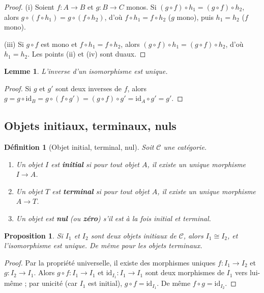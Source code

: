 \documentclass[a4paper,12pt]{book}
\newcommand{\id}{\mathrm{id}}
\newtheorem{proposition}[theoreme]{Proposition}
\newtheorem{lemme}[theoreme]{Lemme}
\newtheorem{definition}[theoreme]{Définition}
\begin{document}
\begin{proof}
(i) Soient $f : A \to B$ et $g : B \to C$ monos. Si $(g \circ f) \circ h_1 = (g \circ f) \circ h_2$, alors $g \circ (f \circ h_1) = g \circ (f \circ h_2)$, d'où $f \circ h_1 = f \circ h_2$ ($g$ mono), puis $h_1 = h_2$ ($f$ mono).

(iii) Si $g \circ f$ est mono et $f \circ h_1 = f \circ h_2$, alors $(g \circ f) \circ h_1 = (g \circ f) \circ h_2$, d'où $h_1 = h_2$. Les points (ii) et (iv) sont duaux.
\end{proof}

\begin{lemme}\label{lem:unicite-inverse}
L'inverse d'un isomorphisme est unique.
\end{lemme}

\begin{proof}
Si $g$ et $g'$ sont deux inverses de $f$, alors $g = g \circ \id_B = g \circ (f \circ g') = (g \circ f) \circ g' = \id_A \circ g' = g'$.
\end{proof}

\subsection{Objets initiaux, terminaux, nuls}

\begin{definition}[Objet initial, terminal, nul]\label{def:init-term-nul}
Soit $\mathcal{C}$ une catégorie.
\begin{enumerate}[label=(\roman*)]
  \item Un objet $I$ est \textbf{initial} si pour tout objet $A$, il existe un unique morphisme $I \to A$.
  \item Un objet $T$ est \textbf{terminal} si pour tout objet $A$, il existe un unique morphisme $A \to T$.
  \item Un objet est \textbf{nul} (ou \textbf{zéro}) s'il est à la fois initial et terminal.
\end{enumerate}
\end{definition}

\begin{proposition}\label{prop:init-term-unique}
Si $I_1$ et $I_2$ sont deux objets initiaux de $\mathcal{C}$, alors $I_1 \cong I_2$, et l'isomorphisme est unique. De même pour les objets terminaux.
\end{proposition}

\begin{proof}
Par la propriété universelle, il existe des morphismes uniques $f : I_1 \to I_2$ et $g : I_2 \to I_1$. Alors $g \circ f : I_1 \to I_1$ et $\id_{I_1} : I_1 \to I_1$ sont deux morphismes de $I_1$ vers lui-même ; par unicité (car $I_1$ est initial), $g \circ f = \id_{I_1}$. De même $f \circ g = \id_{I_2}$.
\end{proof}
\end{document}
